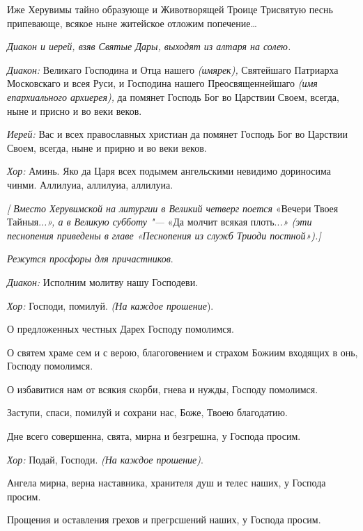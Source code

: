 \begin{mymulticols}

Иже Херувимы тайно образующе и Животворящей Троице Трисвятую песнь припевающе, всякое ныне житейское отложим попечение… 


{\itshape Диакон и иерей, взяв Святые Дары, выходят из алтаря на солею.}

{\itshape Диакон:} Великаго Господина и Отца нашего  {\itshape (имярек),} Святейшаго Патриарха Московскаго и всея Руси, и Господина нашего Преосвященнейшаго {\itshape (имя епархиального архиерея),} да помянет Господь Бог во Царствии Своем, всегда, ныне и присно и во веки веков.

{\itshape Иерей:} Вас и всех православных христиан да помянет Господь Бог во Царствии Своем, всегда, ныне и прирно и во веки веков.

{\itshape Хор:} Аминь. Яко да Царя всех подымем ангельскими невидимо дориносима чинми. Аллилуиа, аллилуиа, аллилуиа.

{\itshape [ Вместо Херувимской на литургии в Великий четверг поется }«Вечери Твоея Тайныя..{\itshape .», а в Великую субботу "--- }«Да молчит всякая плоть..{\itshape .» (эти песнопения приведены в главе «Песнопения из служб Триоди постной»).]}

{\itshape Режутся просфоры для причастников}. 


{\itshape Диакон:} Исполним молитву нашу Господеви. 

{\itshape Хор:} Господи, помилуй. {\itshape (На каждое прошение}). 

О предложенных честных Дарех Господу помолимся. 

О святем храме сем и с верою, благоговением и страхом Божиим входящих в онь, Господу помолимся. 

О избавитися нам от всякия скорби, гнева и нужды, Господу помолимся. 

Заступи, спаси, помилуй и сохрани нас, Боже, Твоею благодатию. 

Дне всего совершенна, свята, мирна и безгрешна, у Господа просим. 

{\itshape Хор:} Подай, Господи. {\itshape (На каждое прошение)}. 

Ангела мирна, верна наставника, хранителя душ и телес наших, у Господа просим. 

Прощения и оставления грехов и прегрсшений наших, у Господа просим. 


\end{mymulticols}
